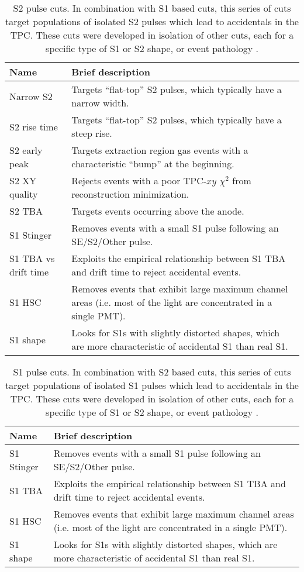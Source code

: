 \begin{table}[h!]
    \centering
    \caption{S2 pulse cuts. In combination with S1 based cuts, this series of cuts target populations of isolated S2 pulses which lead to accidentals in the TPC. These cuts were developed in isolation of other cuts, each for a specific type of S1 or S2 shape, or event pathology \cite{mwilliams:thesis}.}
    \begin{tabular}{|m{10em}m{22em}|}
    \hline
    \textbf{Name}&\textbf{Brief description}\\
    \hline\hline
    Narrow S2 &Targets “flat-top” S2 pulses, which typically have a narrow width.\\
    \hline
    S2 rise time & Targets “flat-top” S2 pulses, which typically have a steep rise.\\
    \hline
    S2 early peak & Targets extraction region gas events with a characteristic “bump” at the beginning.\\
    \hline
    S2 XY quality & Rejects events with a poor TPC-$xy$ $\chi^2$ from reconstruction minimization.\\
    \hline
    S2 TBA & Targets events occurring above the anode.\\
    \hline
    S1 Stinger & Removes events with a small S1 pulse following an SE/S2/Other pulse.\\
    \hline
    S1 TBA vs drift time& Exploits the empirical relationship between S1 TBA and drift time to reject accidental events.\\
    \hline
    S1 HSC & Removes events that exhibit large maximum channel areas (i.e. most of the light are concentrated in a single PMT).\\
    \hline
    S1 shape & Looks for S1s with slightly distorted shapes, which are more characteristic of accidental S1 than real S1.\\
    \hline
    \end{tabular}
\end{table}
\begin{table}[h!]
    \centering
    \caption{S1 pulse cuts. In combination with S2 based cuts, this series of cuts target populations of isolated S1 pulses which lead to accidentals in the TPC. These cuts were developed in isolation of other cuts, each for a specific type of S1 or S2 shape, or event pathology \cite{mwilliams:thesis}.}
    \begin{tabular}{|m{10em}m{22em}|}
    \hline
    \textbf{Name}&\textbf{Brief description}\\
    \hline\hline
    S1 Stinger & Removes events with a small S1 pulse following an SE/S2/Other pulse.\\
    \hline
    S1 TBA & Exploits the empirical relationship between S1 TBA and drift time to reject accidental events.\\
    \hline
    S1 HSC & Removes events that exhibit large maximum channel areas (i.e. most of the light are concentrated in a single PMT).\\
    \hline
    S1 shape & Looks for S1s with slightly distorted shapes, which are more characteristic of accidental S1 than real S1.\\
    \hline
    \end{tabular}
\end{table}